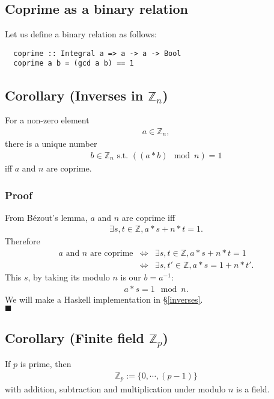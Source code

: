 \documentclass[11pt]{book}
\begin{document}
\subsection{Coprime as a binary relation}
Let us define a binary relation as follows:
\begin{verbatim}
  coprime :: Integral a => a -> a -> Bool
  coprime a b = (gcd a b) == 1
\end{verbatim}

\subsection{Corollary (Inverses in $\mathbb{Z}_n$)}
For a non-zero element
\begin{eqnarray}
a \in \mathbb{Z}_n,
\end{eqnarray}
there is a unique number 
\begin{eqnarray}
b \in \mathbb{Z}_n \text{ s.t. } ((a*b) \mod n) = 1
\end{eqnarray}
iff $a$ and $n$ are coprime.

\subsubsection{Proof}
From B\'ezout's lemma, $a$ and $n$ are coprime iff
\begin{eqnarray}
\exists s,t \in \mathbb{Z}, a*s + n*t = 1.
\end{eqnarray}
Therefore
\begin{eqnarray}
\text{$a$ and $n$ are coprime} &\Leftrightarrow& \exists s,t \in \mathbb{Z}, a*s + n*t = 1 \\
&\Leftrightarrow &\exists s,t' \in \mathbb{Z}, a*s = 1 + n*t'.
\end{eqnarray}
This $s$, by taking its modulo $n$ is our $b = a^{-1}$:
\begin{eqnarray}
a*s = 1 \mod n.
\end{eqnarray}
We will make a Haskell implementation in \S\ref{inverses}.\\
$\blacksquare$

\subsection{Corollary (Finite field $\mathbb{Z}_p$)}
If $p$ is prime, then 
\begin{eqnarray}
\mathbb{Z}_p := \{0, \cdots, (p-1)\}
\end{eqnarray}
with addition, subtraction and multiplication under modulo $n$ is a field.
\end{document}
